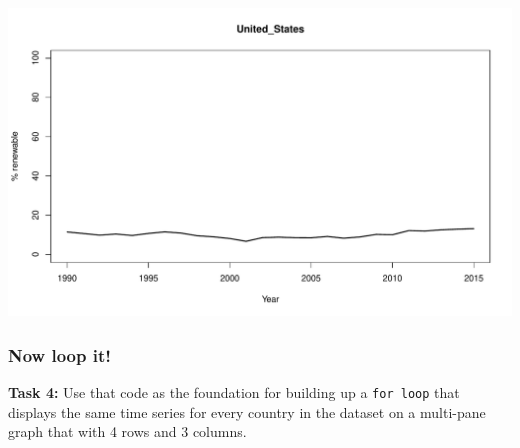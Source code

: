 \documentclass[
]{book}
\newenvironment{Shaded}{\begin{snugshade}}{\end{snugshade}}
\newcommand{\CommentTok}[1]{\textcolor[rgb]{0.56,0.35,0.01}{\textit{#1}}}
\newcommand{\DataTypeTok}[1]{\textcolor[rgb]{0.13,0.29,0.53}{#1}}
\newcommand{\DecValTok}[1]{\textcolor[rgb]{0.00,0.00,0.81}{#1}}
\newcommand{\KeywordTok}[1]{\textcolor[rgb]{0.13,0.29,0.53}{\textbf{#1}}}
\newcommand{\NormalTok}[1]{#1}
\newcommand{\StringTok}[1]{\textcolor[rgb]{0.31,0.60,0.02}{#1}}
\begin{document}
\begin{Shaded}
\end{Shaded}

\includegraphics{figures/unnamed-chunk-248-1.pdf}

\hypertarget{now-loop-it}{%
\subsubsection*{Now loop it!}\label{now-loop-it}}

\textbf{Task 4:} Use that code as the foundation for building up a \texttt{for\ loop} that displays the same time series for every country in the dataset on a multi-pane graph that with 4 rows and 3 columns.
\end{document}
